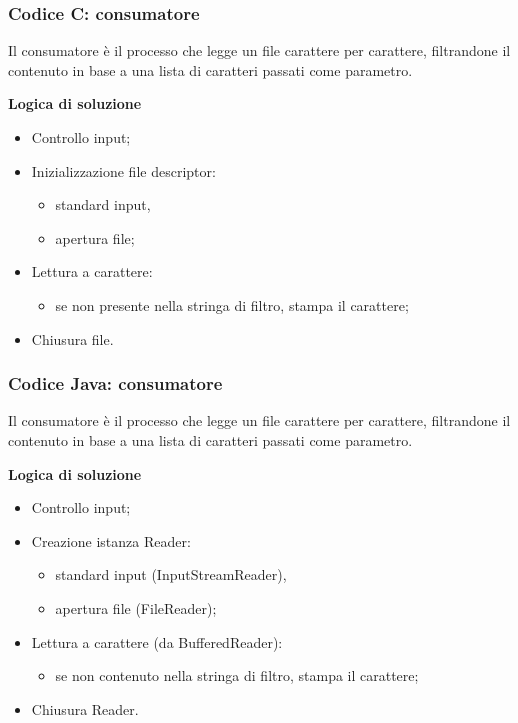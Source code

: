 \documentclass{beamer}
\begin{document}
\begin{frame}
\frametitle{Codice C: consumatore}
Il consumatore è il processo che legge un file carattere per carattere, filtrandone il contenuto in base a una lista di caratteri passati come parametro.

\textbf{Logica di soluzione}
\begin{itemize}
\item Controllo input;
\item Inizializzazione file descriptor:
\begin{itemize}
\item standard input,
\item apertura file;
\end{itemize}
\item Lettura a carattere:
\begin{itemize}
\item se non presente nella stringa di filtro, stampa il carattere;
\end{itemize}
\item Chiusura file.
\end{itemize}
\end{frame}
\begin{frame}
\frametitle{Codice Java: consumatore}
Il consumatore è il processo che legge un file carattere per carattere, filtrandone il contenuto in base a una lista di caratteri passati come parametro.


\textbf{Logica di soluzione}
\begin{itemize}
\item Controllo input;
\item Creazione istanza Reader:
\begin{itemize}
\item standard input (InputStreamReader),
\item apertura file (FileReader);
\end{itemize}
\item Lettura a carattere (da BufferedReader):
\begin{itemize}
\item se non contenuto nella stringa di filtro, stampa il carattere;
\end{itemize}
\item Chiusura Reader.

\end{itemize}
\end{frame}
\end{document}
